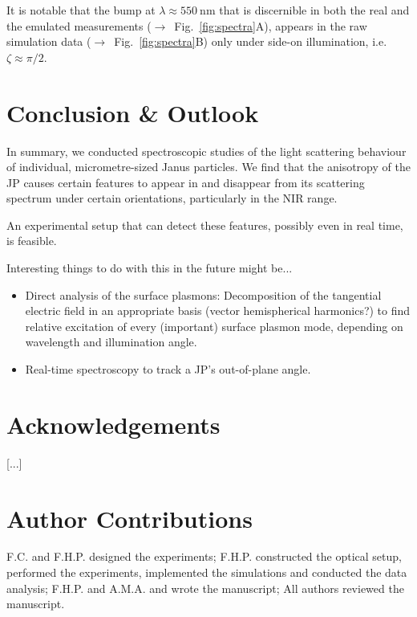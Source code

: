 \documentclass[10pt]{article}
\newcommand{\seefig}[2]{\mbox{\sffamily($\rightarrow$ Fig. \ref{#1}#2)}}
\begin{document}
\begin{multicols}{2}
It is notable that the bump at \mbox{$\lambda \approx \SI{550}{\nano\meter}$} that is discernible in both the real and the emulated measurements \seefig{fig:spectra}{A}, appears in the raw simulation data \seefig{fig:spectra}{B} only under side-on illumination, i.e. \mbox{$\zeta\approx\pi/2$}. 

\section*{Conclusion \& Outlook}

In summary, we conducted spectroscopic studies of the light scattering behaviour of individual, micrometre-sized Janus particles. 
We find that the anisotropy of the JP causes certain features to appear in and disappear from its scattering spectrum under certain orientations, particularly in the NIR range. 

An experimental setup that can detect these features, possibly even in real time, is feasible.

Interesting things to do with this in the future might be...
\begin{itemize}
    \item Direct analysis of the surface plasmons: 
    Decomposition of the tangential electric field in an appropriate basis (vector hemispherical harmonics?) to find relative excitation of every (important) surface plasmon mode, depending on wavelength and illumination angle.
    \item Real-time spectroscopy to track a JP's out-of-plane angle. 
\end{itemize}






\printbibliography

\section*{Acknowledgements}
[...]

\section*{Author Contributions}
F.C. and F.H.P. designed the experiments; 
F.H.P. constructed the optical setup, performed the experiments, implemented the simulations and conducted the data analysis; 
F.H.P. and A.M.A. and wrote the manuscript; 
All authors reviewed the manuscript.


\end{multicols}
\end{document}
